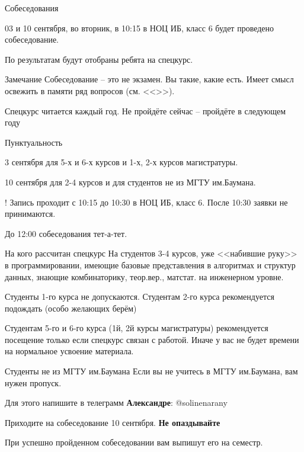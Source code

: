   \begin{frame}{Собеседования}
  
  03 и 10 сентября, во вторник, в 10:15 в НОЦ ИБ, класс 6
  будет проведено собеседование. 
  
  По результатам будут отобраны ребята на спецкурс.

   \begin{block}{Замечание}
   	Собеседование -- это не экзамен. Вы такие, какие есть. 
   	Имеет смысл освежить в памяти ряд вопросов 
   	(см. <<>>).
   	
   	Спецкурс читается каждый год. Не пройдёте сейчас -- 
   	пройдёте в следующем году
   \end{block}
  \end{frame}

  \begin{frame}{Пунктуальность}
  
  3 сентября для 5-х и 6-х курсов и 1-х, 2-х курсов магистратуры.	
  
  10 сентября для 2-4 курсов и для студентов не из МГТУ им.Баумана.
  
  \begin{block}{!}
  Запись проходит с 10:15 до 10:30 в НОЦ ИБ, класс 6.
  После 10:30 заявки не принимаются.
  \end{block}
  
  До 12:00 собеседования тет-а-тет.
  
  \end{frame}
  
  \begin{frame}{На кого рассчитан спецкурс}
  На студентов 3-4 курсов, уже <<набившие руку>> в программировании,
  имеющие базовые представления в алгоритмах и структур данных,
  знающие комбинаторику, теор.вер., матстат. на инженерном уровне.
  
  Студенты 1-го курса не допускаются. Студентам 2-го курса рекомендуется подождать
  (особо желающих берём)
  
  Студентам 5-го и 6-го курса (1й, 2й курсы магистратуры) рекомендуется посещение только если 
  спецкурс
  связан с работой.
  Иначе у вас не будет времени на нормальное усвоение материала.
  
  \end{frame}

  \begin{frame}{Студенты не из МГТУ им.Баумана}
  Если вы не учитесь в МГТУ им.Баумана, вам нужен пропуск.
  
  Для этого напишите в телеграмм \textbf{Александре}: @solinenarany
  
  Приходите на собеседование 10 сентября. 
  \textbf{Не опаздывайте}
  
  При успешно пройденном собеседовании вам выпишут его на семестр.
  \end{frame}
  

